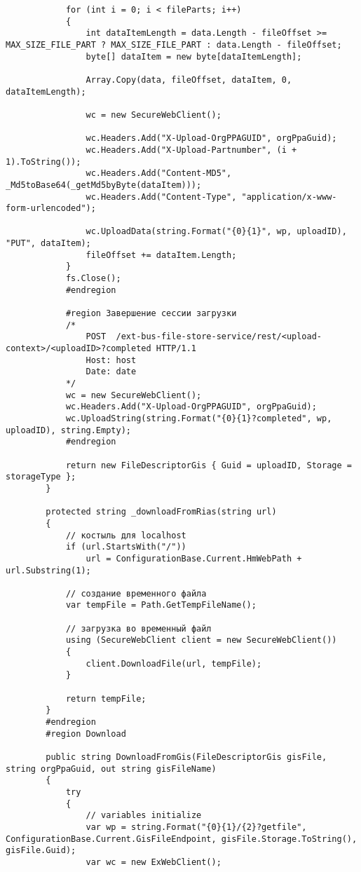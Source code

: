 \begin{lstlisting}
            for (int i = 0; i < fileParts; i++)
            {
                int dataItemLength = data.Length - fileOffset >= MAX_SIZE_FILE_PART ? MAX_SIZE_FILE_PART : data.Length - fileOffset;
                byte[] dataItem = new byte[dataItemLength];

                Array.Copy(data, fileOffset, dataItem, 0, dataItemLength);

                wc = new SecureWebClient();

                wc.Headers.Add("X-Upload-OrgPPAGUID", orgPpaGuid);
                wc.Headers.Add("X-Upload-Partnumber", (i + 1).ToString());
                wc.Headers.Add("Content-MD5", _Md5toBase64(_getMd5byByte(dataItem)));
                wc.Headers.Add("Content-Type", "application/x-www-form-urlencoded");

                wc.UploadData(string.Format("{0}{1}", wp, uploadID), "PUT", dataItem);
                fileOffset += dataItem.Length;
            }
            fs.Close();
            #endregion

            #region Завершение сессии загрузки
            /*
                POST  /ext-bus-file-store-service/rest/<upload-context>/<uploadID>?completed HTTP/1.1
                Host: host
                Date: date
            */
            wc = new SecureWebClient();
            wc.Headers.Add("X-Upload-OrgPPAGUID", orgPpaGuid);
            wc.UploadString(string.Format("{0}{1}?completed", wp, uploadID), string.Empty);
            #endregion

            return new FileDescriptorGis { Guid = uploadID, Storage = storageType };
        }

        protected string _downloadFromRias(string url)
        {
            // костыль для localhost
            if (url.StartsWith("/"))
                url = ConfigurationBase.Current.HmWebPath + url.Substring(1);

            // создание временного файла
            var tempFile = Path.GetTempFileName();

            // загрузка во временный файл
            using (SecureWebClient client = new SecureWebClient())
            {
                client.DownloadFile(url, tempFile);
            }

            return tempFile;
        }
        #endregion
        #region Download

        public string DownloadFromGis(FileDescriptorGis gisFile, string orgPpaGuid, out string gisFileName)
        {
            try
            {
                // variables initialize
                var wp = string.Format("{0}{1}/{2}?getfile", ConfigurationBase.Current.GisFileEndpoint, gisFile.Storage.ToString(), gisFile.Guid);
                var wc = new ExWebClient();


\end{lstlisting}
